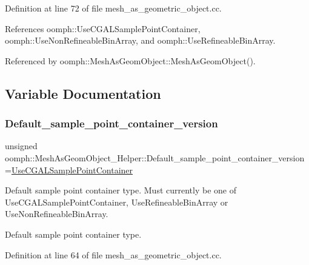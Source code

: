Definition at line 72 of file mesh\+\_\+as\+\_\+geometric\+\_\+object.\+cc.



References oomph\+::\+Use\+C\+G\+A\+L\+Sample\+Point\+Container, oomph\+::\+Use\+Non\+Refineable\+Bin\+Array, and oomph\+::\+Use\+Refineable\+Bin\+Array.



Referenced by oomph\+::\+Mesh\+As\+Geom\+Object\+::\+Mesh\+As\+Geom\+Object().



\subsection{Variable Documentation}
\mbox{\label{namespaceoomph_1_1MeshAsGeomObject__Helper_a215c84a14b595f33f254c5e059e88958}} 
\subsubsection{\texorpdfstring{Default\+\_\+sample\+\_\+point\+\_\+container\+\_\+version}{Default\_sample\_point\_container\_version}}
{\footnotesize\ttfamily unsigned oomph\+::\+Mesh\+As\+Geom\+Object\+\_\+\+Helper\+::\+Default\+\_\+sample\+\_\+point\+\_\+container\+\_\+version =\hyperlink{namespaceoomph_a8c0fdc9bd9751811cd49fe6f06c55991a75595ef05f43add7443737e4fe76cd61}{Use\+C\+G\+A\+L\+Sample\+Point\+Container}}



Default sample point container type. Must currently be one of Use\+C\+G\+A\+L\+Sample\+Point\+Container, Use\+Refineable\+Bin\+Array or Use\+Non\+Refineable\+Bin\+Array. 

Default sample point container type. 

Definition at line 64 of file mesh\+\_\+as\+\_\+geometric\+\_\+object.\+cc.

